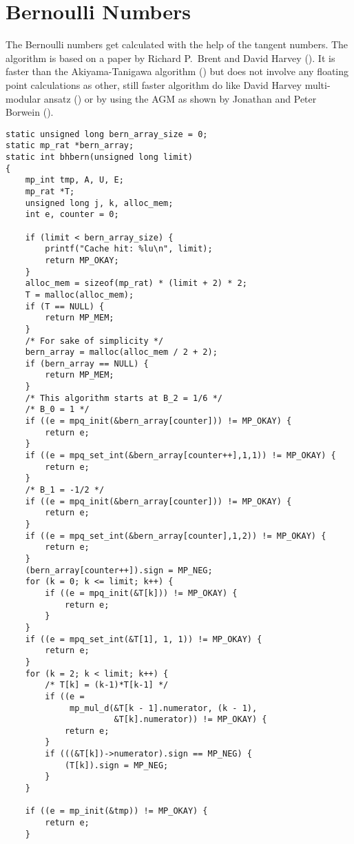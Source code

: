 \documentclass[10pt]{book}
\theoremstyle{definition}
\theoremstyle{remark}
\begin{document}
\section{Bernoulli Numbers}
The Bernoulli numbers get calculated with the help of the tangent numbers. The
algorithm is based on a paper by Richard P.~Brent and David Harvey
(\cite{2011arXiv1108.0286B}). It is faster than the Akiyama-Tanigawa algorithm 
(\cite{akiyama2001multiple})
but does not involve any floating point calculations as other, still faster
algorithm do like David Harvey multi-modular ansatz (\cite{2008arXiv0807.1347H})
or by using the AGM as shown by Jonathan and Peter Borwein (\cite{borwein1987pi}).
 \begin{center}
    \begin{lstlisting}[caption={Bernoulli Numbers by Tangent Numbers},label=bernrat]
static unsigned long bern_array_size = 0;
static mp_rat *bern_array;
static int bhbern(unsigned long limit)
{
    mp_int tmp, A, U, E;
    mp_rat *T;
    unsigned long j, k, alloc_mem;
    int e, counter = 0;

    if (limit < bern_array_size) {
        printf("Cache hit: %lu\n", limit);
        return MP_OKAY;
    }
    alloc_mem = sizeof(mp_rat) * (limit + 2) * 2;
    T = malloc(alloc_mem);
    if (T == NULL) {
        return MP_MEM;
    }
    /* For sake of simplicity */
    bern_array = malloc(alloc_mem / 2 + 2);
    if (bern_array == NULL) {
        return MP_MEM;
    }
    /* This algorithm starts at B_2 = 1/6 */
    /* B_0 = 1 */
    if ((e = mpq_init(&bern_array[counter])) != MP_OKAY) {
        return e;
    }
    if ((e = mpq_set_int(&bern_array[counter++],1,1)) != MP_OKAY) {
        return e;
    }
    /* B_1 = -1/2 */
    if ((e = mpq_init(&bern_array[counter])) != MP_OKAY) {
        return e;
    }
    if ((e = mpq_set_int(&bern_array[counter],1,2)) != MP_OKAY) {
        return e;
    }
    (bern_array[counter++]).sign = MP_NEG;
    for (k = 0; k <= limit; k++) {
        if ((e = mpq_init(&T[k])) != MP_OKAY) {
            return e;
        }
    }
    if ((e = mpq_set_int(&T[1], 1, 1)) != MP_OKAY) {
        return e;
    }
    for (k = 2; k < limit; k++) {
        /* T[k] = (k-1)*T[k-1] */
        if ((e =
             mp_mul_d(&T[k - 1].numerator, (k - 1),
                      &T[k].numerator)) != MP_OKAY) {
            return e;
        }
        if (((&T[k])->numerator).sign == MP_NEG) {
            (T[k]).sign = MP_NEG;
        }
    }

    if ((e = mp_init(&tmp)) != MP_OKAY) {
        return e;
    }


\end{lstlisting}
\end{center}
\end{document}
